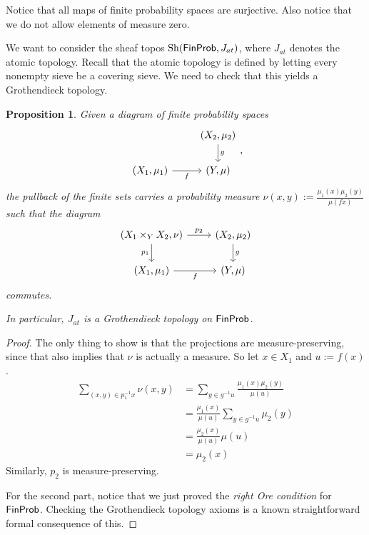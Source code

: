 \documentclass[a4paper]{amsproc}
\theoremstyle{plain}
\newtheorem{proposition}[theorem]{Proposition}
\theoremstyle{definition}
\theoremstyle{remark}
\numberwithin{equation}{section}
\DeclareMathOperator{\Sh}{Sh}
\newcommand{\FinProb}{\textup{\textsf{FinProb}}}
\begin{document}
Notice that all maps of finite probability spaces are surjective. Also notice that we do not allow elements of measure zero.

We want to consider the sheaf topos $\Sh(\FinProb, J_{at})$, where $J_{at}$ denotes the atomic topology. Recall that the atomic topology is defined by letting every nonempty sieve be a covering sieve. We need to check that this yields a Grothendieck topology.

\begin{proposition} \label{pullbackMeasure}
    Given a diagram of finite probability spaces
    \[
    \begin{tikzcd}
                                & {(X_2,\mu_2)} \arrow[d, "g"] \\
    {(X_1, \mu_1)} \arrow[r, "f"'] & {(Y,\mu)}
    \end{tikzcd},
    \]
    the pullback of the finite sets carries a probability measure $\nu(x,y) := \frac{\mu_1(x) \mu_2(y)}{\mu(f x)}$ such that the diagram
    \[
    \begin{tikzcd}
    {(X_1 \times_Y X_2, \nu)} \arrow[d, "p_1"'] \arrow[r, "p_2"] & {(X_2,\mu_2)} \arrow[d, "g"] \\
    {(X_1, \mu_1)} \arrow[r, "f"']                               & {(Y,\mu)}
    \end{tikzcd}
    \]
    commutes.

    In particular, $J_{at}$ is a Grothendieck topology on $\FinProb$.
\end{proposition}
\begin{proof}
    The only thing to show is that the projections are measure-preserving, since that also implies that $\nu$ is actually a measure. So let $x \in X_1$ and $u := f(x)$.
    \begin{align*}
        \sum_{(x,y) \in p_1^{-1} x} \nu(x,y) &= \sum_{y \in g^{-1} u} \frac{\mu_1(x)\mu_2(y)}{\mu(u)} \\
        &= \frac{\mu_1(x)}{\mu(u)} \sum_{y \in g^{-1} u} \mu_2(y) \\
        &= \frac{\mu_2(x)}{\mu(u)} \mu(u) \\
        &= \mu_2(x)
    \end{align*}
    Similarly, $p_2$ is measure-preserving.

    For the second part, notice that we just proved the \emph{right Ore condition} for $\FinProb$. Checking the Grothendieck topology axioms is a known straightforward formal consequence of this.
\end{proof}
\end{document}
